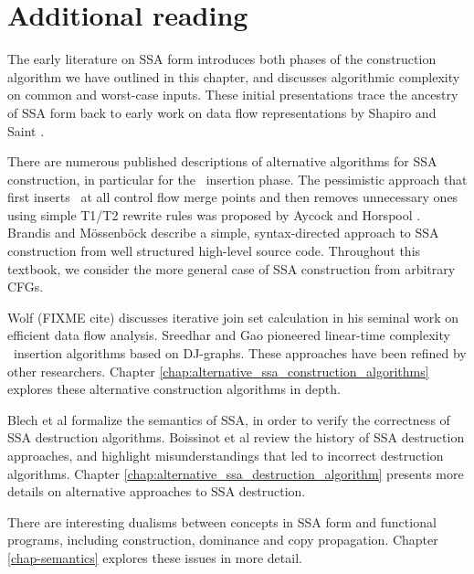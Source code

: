 \section{Additional reading}

The early literature on SSA form
\cite{cytron89efficient,cytron91efficiently}
introduces both phases of the construction algorithm
we have outlined in this chapter,
and discusses algorithmic complexity on common and worst-case inputs.
These initial presentations trace the ancestry of SSA form back to
early work on data flow representations by Shapiro and Saint
\cite{shapiro69representation}.

There are numerous published descriptions of alternative algorithms
for SSA construction, in particular for the \phiop\ insertion phase.
The pessimistic approach that first inserts \phiops\ at all control
flow merge points and then removes unnecessary ones using simple T1/T2
rewrite rules was proposed by Aycock
and Horspool \cite{aycock00simple}. 
Brandis and M\"{o}ssenb\"{o}ck 
\cite{brandis94single}
describe a 
simple, syntax-directed approach to SSA construction from 
well structured high-level source code.
Throughout this textbook, we consider the more
general case of SSA construction from arbitrary CFGs.

Wolf (FIXME cite) discusses iterative join set calculation in his
seminal work on efficient data flow analysis.
Sreedhar and Gao \cite{sreedhar95linear} pioneered
linear-time complexity 
\phiop\ insertion
algorithms based on DJ-graphs.
These approaches have been refined by other researchers.
Chapter \ref{chap:alternative_ssa_construction_algorithms}
explores these alternative construction algorithms in depth.


Blech et al \cite{blech05optimizing}
formalize the semantics of SSA, in order to verify
the correctness of SSA destruction algorithms.
Boissinot et al \cite{boissinot09revisiting} review the history of SSA destruction approaches,
and highlight misunderstandings that led to incorrect destruction
algorithms.
Chapter \ref{chap:alternative_ssa_destruction_algorithm} presents
more details on alternative approaches to SSA destruction.

There are interesting dualisms between concepts in SSA form
and
functional programs, including construction, dominance and
copy propagation. Chapter \ref{chap-semantics} explores these issues
in more detail.



